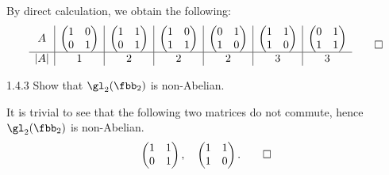 \begin{sol}
    By direct calculation, we obtain the following:
    \[
        \begin{array}{c|c|c|c|c|c|c}
            A & 
            \begin{pmatrix}
                1 & 0 \\
                0 & 1
            \end{pmatrix} & 
            \begin{pmatrix}
                1 & 1 \\
                0 & 1
            \end{pmatrix} &
            \begin{pmatrix}
                1 & 0 \\
                1 & 1
            \end{pmatrix} &
            \begin{pmatrix}
                0 & 1 \\
                1 & 0
            \end{pmatrix} &
            \begin{pmatrix}
                1 & 1 \\
                1 & 0
            \end{pmatrix} &
            \begin{pmatrix}
                0 & 1 \\
                1 & 1
            \end{pmatrix} \\
            \hline
            |A| & 1 & 2 & 2 & 2 & 3 & 3
        \end{array} \qedhere
    \]
\end{sol}

\begin{exercise}{1.4.3}
    Show that $\gl_2(\fbb_2)$ is non-Abelian.
\end{exercise}

\begin{sol}
    It is trivial to see that the following two matrices do not commute, hence $\gl_2(\fbb_2)$ is non-Abelian.
    \[
        \begin{pmatrix}
            1 & 1 \\
            0 & 1
        \end{pmatrix}, \quad
        \begin{pmatrix}
            1 & 1 \\
            1 & 0
        \end{pmatrix}. \qedhere
    \]
\end{sol}

